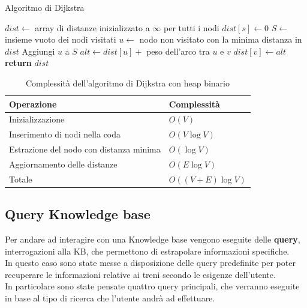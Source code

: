 \documentclass[italian,12pt,a4paper]{article}
\begin{document}
					\begin{algorithm}[h]
						\caption{Algoritmo di Dijkstra}
						\begin{algorithmic}[1]
							\State $dist \gets$ array di distanze inizializzato a $\infty$ per tutti i nodi
							\State $dist[s] \gets 0$
							\State $S \gets$ insieme vuoto dei nodi visitati
							\State $u \gets$ nodo non visitato con la minima distanza in $dist$
							\State Aggiungi $u$ a $S$
							\State $alt \gets dist[u] +$ peso dell'arco tra $u$ e $v$
							\State $dist[v] \gets alt$
							\EndIf
							\EndFor
							\EndWhile
							\State \textbf{return} $dist$ 
							\EndProcedure
						\end{algorithmic}
					\end{algorithm}
					\vspace{200px}
					
					\begin{table}[h]
						\centering
						\begin{tabular}{|l|l|}
							\hline
							\textbf{Operazione} & \textbf{Complessità} \\ \hline
							Inizializzazione & $O(V)$ \\ \hline
							Inserimento di nodi nella coda & $O(V \log V)$ \\ \hline
							Estrazione del nodo con distanza minima & $O(\log V)$ \\ \hline
							Aggiornamento delle distanze & $O(E \log V)$ \\ \hline
							Totale & $O((V + E) \log V)$ \\ \hline
						\end{tabular}
						\caption{Complessità dell'algoritmo di Dijkstra con heap binario}
					\end{table}
	
	\vspace{20px}

			\subsection{Query Knowledge base}
				Per andare ad interagire con una Knowledge base vengono eseguite delle \textbf{query}, interrogazioni alla KB, che permettono di estrapolare informazioni specifiche.\\
				In questo caso sono state messe a disposizione delle query predefinite per poter recuperare le informazioni relative ai treni secondo le esigenze dell'utente. \\
				In particolare sono state pensate quattro query principali, che verranno eseguite in base al tipo di ricerca che l'utente andrà ad effettuare.\\
				\linebreak
				\newpage
\end{document}
